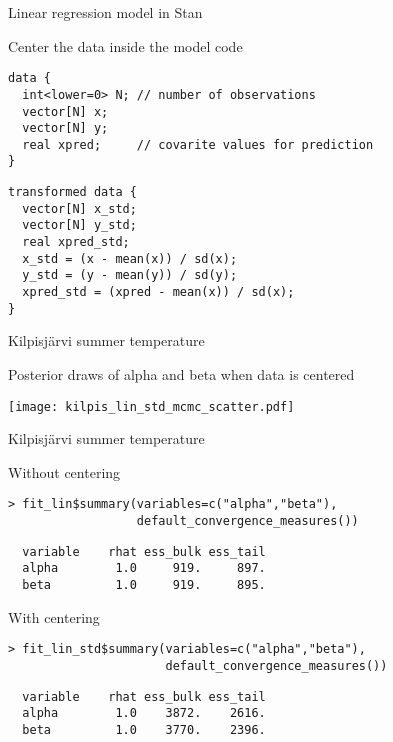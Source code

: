 \documentclass[finnish,english,t]{beamer}
\begin{document}
\begin{frame}[fragile]{Linear regression model in Stan}

Center the data inside the model code
  
{\footnotesize
\begin{verbatim}
data {
  int<lower=0> N; // number of observations
  vector[N] x; 
  vector[N] y; 
  real xpred;     // covarite values for prediction
}
\end{verbatim}
\begin{verbatim}
transformed data {
  vector[N] x_std;
  vector[N] y_std;
  real xpred_std;
  x_std = (x - mean(x)) / sd(x);
  y_std = (y - mean(y)) / sd(y);
  xpred_std = (xpred - mean(x)) / sd(x);
}
\end{verbatim}
}
\end{frame}

\begin{frame}[fragile]{Kilpisjärvi summer temperature}
  
  Posterior draws of alpha and beta when data is centered
  
  \begin{center}
    \texttt{[image: kilpis\_lin\_std\_mcmc\_scatter.pdf]}
  \end{center}

\end{frame}

\begin{frame}[fragile]{Kilpisjärvi summer temperature}

Without centering  
{\footnotesize
\begin{verbatim}
> fit_lin$summary(variables=c("alpha","beta"),
                  default_convergence_measures())
\end{verbatim}
  \vspace{-\baselineskip}
\begin{verbatim}
  variable    rhat ess_bulk ess_tail
  alpha        1.0     919.     897.
  beta         1.0     919.     895.
\end{verbatim}
  }

With centering  
{\footnotesize
\begin{verbatim}
> fit_lin_std$summary(variables=c("alpha","beta"),
                      default_convergence_measures())
\end{verbatim}
  \vspace{-\baselineskip}
\begin{verbatim}
  variable    rhat ess_bulk ess_tail
  alpha        1.0    3872.    2616.
  beta         1.0    3770.    2396.
\end{verbatim}
  }
\end{frame}
\end{document}
